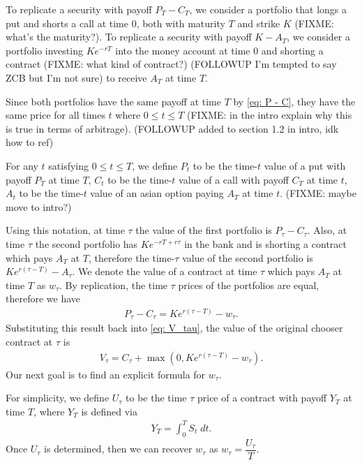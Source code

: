 \documentclass[reqno]{amsart}
\begin{document}
To replicate a security with payoff $P_T - C_T$, we consider a portfolio that longs a put and shorts a call at time $0$, both with maturity $T$ and strike $K$ (FIXME: what's the maturity?). To replicate a security with payoff $K - A_T$,  we consider a portfolio investing $Ke^{-rT}$ into the money account at time 0 and shorting a contract (FIXME: what kind of contract?) (FOLLOWUP I'm tempted to say ZCB but I'm not sure) to receive $A_T$ at time $T$. 

Since both portfolios have the same payoff at time $T$ by \eqref{eq: P - C}, they have the same price for all times $t$ where $0 \leq t \leq T$ (FIXME: in the intro explain why this is true in terms of arbitrage). (FOLLOWUP added to section 1.2 in intro, idk how to ref)

For any $t$ satisfying $0 \le t \le T$, we define $P_t$ to be the time-$t$ value of a put with payoff $P_T$ at time $T$, $C_t$ to be the time-$t$ value of a call with payoff $C_T$ at time $t$, $A_t$ to be the time-$t$ value of an asian option paying $A_T$ at time $t$. (FIXME: maybe move to intro?)

Using this notation, at time $\tau$ the value of the first portfolio is $P_\tau - C_\tau$. Also, at time $\tau$ the second portfolio has $Ke^{-rT + r\tau}$ in the bank and is shorting a contract which pays $A_T$ at $T$, therefore the time-$\tau$ value of the second portfolio is $Ke^{r(\tau - T)} - A_\tau$. We denote the value of a contract at time $\tau$ which pays $A_T$ at time $T$ as $w_\tau$.
By replication, the time $\tau$ prices of the portfolios are equal, therefore we have 
\begin{align}\label{eq: P-C Parity}
     P_\tau - C_\tau = Ke^{r(\tau - T)} - w_\tau.
\end{align}
Substituting this result back into \eqref{eq: V_tau}, the value of the original chooser contract at $\tau$ is
\begin{align}
     V_\tau = C_\tau + \max(0, Ke^{r(\tau - T)} - w_\tau).
\end{align}
Our next goal is to find an explicit formula for $w_\tau$. 

For simplicity, we define $U_\tau$ to be the time $\tau$ price of a contract with payoff $Y_T$ at time $T$, where $Y_T$ is defined via
\begin{align}\label{eq: y}
     Y_T = \int_0^T S_t \; dt.
\end{align}
Once $U_\tau$ is determined, then we can recover $w_\tau$ as $w_\tau = \dfrac{U_\tau}{T}$. 
\end{document}
